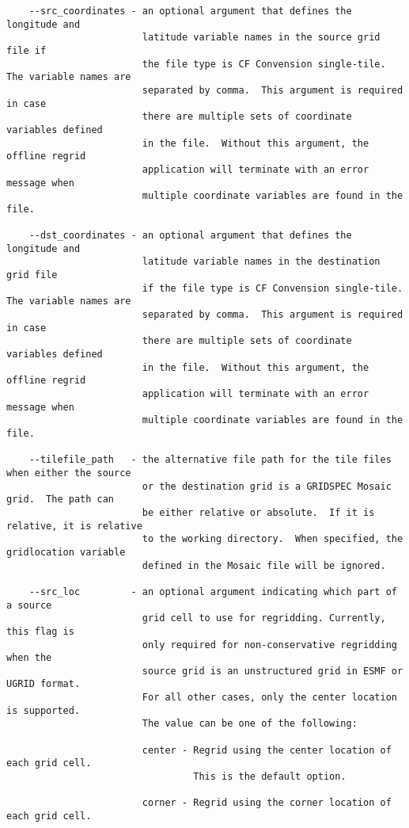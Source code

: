 \begin{verbatim}
    --src_coordinates - an optional argument that defines the longitude and
                        latitude variable names in the source grid file if
                        the file type is CF Convension single-tile.  The variable names are
                        separated by comma.  This argument is required in case
                        there are multiple sets of coordinate variables defined
                        in the file.  Without this argument, the offline regrid
                        application will terminate with an error message when
                        multiple coordinate variables are found in the file.

    --dst_coordinates - an optional argument that defines the longitude and
                        latitude variable names in the destination grid file
                        if the file type is CF Convension single-tile.  The variable names are
                        separated by comma.  This argument is required in case
                        there are multiple sets of coordinate variables defined
                        in the file.  Without this argument, the offline regrid
                        application will terminate with an error message when
                        multiple coordinate variables are found in the file.

    --tilefile_path   - the alternative file path for the tile files when either the source
                        or the destination grid is a GRIDSPEC Mosaic grid.  The path can
                        be either relative or absolute.  If it is relative, it is relative
                        to the working directory.  When specified, the gridlocation variable
                        defined in the Mosaic file will be ignored. 
                
    --src_loc         - an optional argument indicating which part of a source
                        grid cell to use for regridding. Currently, this flag is 
                        only required for non-conservative regridding when the 
                        source grid is an unstructured grid in ESMF or UGRID format.
                        For all other cases, only the center location is supported.
                        The value can be one of the following:

                        center - Regrid using the center location of each grid cell. 
                                 This is the default option. 

                        corner - Regrid using the corner location of each grid cell. 


\end{verbatim}

